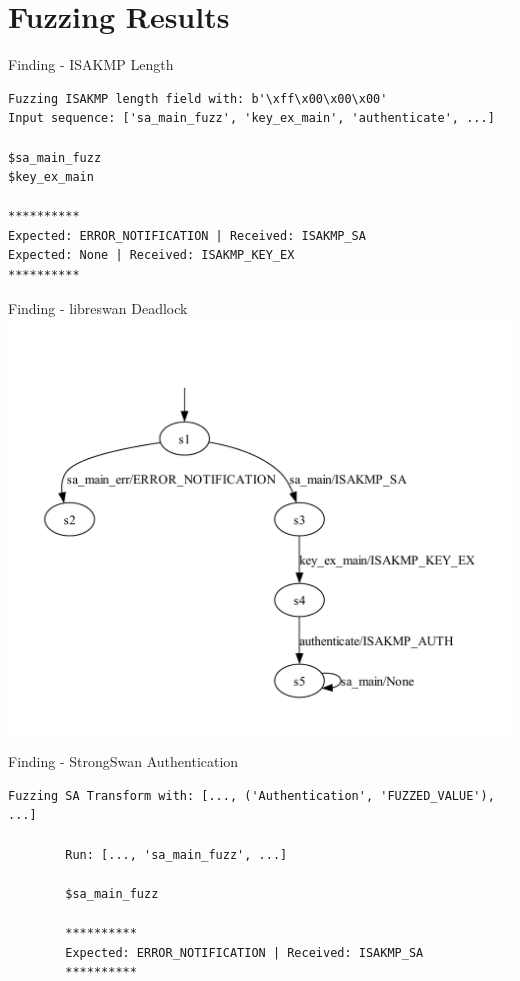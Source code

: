 \documentclass[aspectratio=169, xcolor=table]{beamer}
\begin{document}
\section*{Fuzzing Results}
\begin{frame}[fragile]{Finding -  ISAKMP Length}
	\vspace{-2ex}
	\begin{lstlisting}[]
Fuzzing ISAKMP length field with: b'\xff\x00\x00\x00'
Input sequence: ['sa_main_fuzz', 'key_ex_main', 'authenticate', ...]

$sa_main_fuzz
$key_ex_main

**********
Expected: ERROR_NOTIFICATION | Received: ISAKMP_SA
Expected: None | Received: ISAKMP_KEY_EX
**********
	\end{lstlisting}
\end{frame}

\begin{frame}{Finding - libreswan Deadlock}
	\vspace{-4em}
	\centering
	\includegraphics[height=1.0\textheight, trim={8em 0 0 0}]{models/LearnedModelLibreReference}
\end{frame}

\begin{frame}[fragile]{Finding - StrongSwan Authentication}
	\vspace{-2ex}
	\begin{lstlisting}[]
		Fuzzing SA Transform with: [..., ('Authentication', 'FUZZED_VALUE'), ...]
		
		Run: [..., 'sa_main_fuzz', ...]
		
		$sa_main_fuzz
		
		**********
		Expected: ERROR_NOTIFICATION | Received: ISAKMP_SA
		**********
	\end{lstlisting}
\end{frame}
\end{document}
